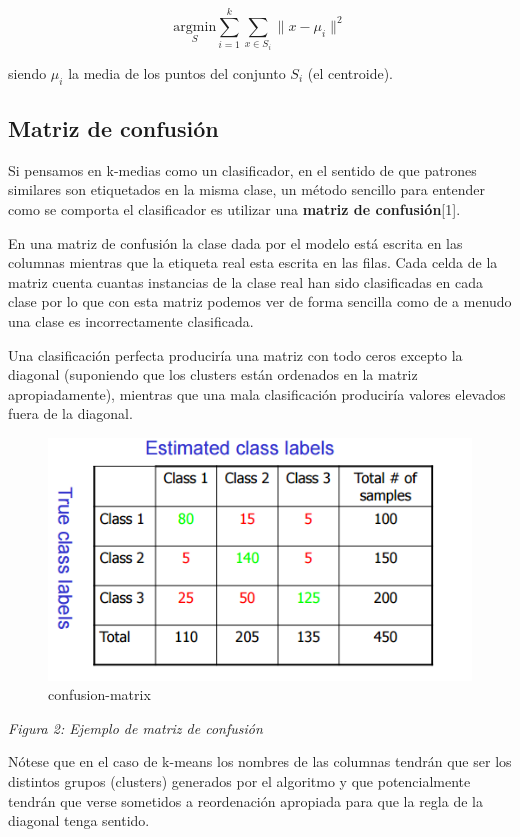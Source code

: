 \documentclass[11pt]{article}
\makeatletter
\def\maxwidth{\ifdim\Gin@nat@width>\linewidth\linewidth
    \else\Gin@nat@width\fi}
\let\Oldincludegraphics\includegraphics
\renewcommand{\includegraphics}[1]{\Oldincludegraphics[width=.8\maxwidth]{#1}}
\makeatother
\begin{document}
\[\underset{S}{\mathrm{argmin}} \sum_{i=1}^{k} \sum_{x \in S_i} \|x -\mu_i\|^2\]

siendo \(\mu_i\) la media de los puntos del conjunto \(S_i\) (el
centroide).

\subsection{Matriz de confusión}\label{matriz-de-confusiuxf3n}

Si pensamos en k-medias como un clasificador, en el sentido de que
patrones similares son etiquetados en la misma clase, un método sencillo
para entender como se comporta el clasificador es utilizar una
\textbf{matriz de confusión}{[}1{]}.

En una matriz de confusión la clase dada por el modelo está escrita en
las columnas mientras que la etiqueta real esta escrita en las filas.
Cada celda de la matriz cuenta cuantas instancias de la clase real han
sido clasificadas en cada clase por lo que con esta matriz podemos ver
de forma sencilla como de a menudo una clase es incorrectamente
clasificada.

Una clasificación perfecta produciría una matriz con todo ceros excepto
la diagonal (suponiendo que los clusters están ordenados en la matriz
apropiadamente), mientras que una mala clasificación produciría valores
elevados fuera de la diagonal.

\begin{figure}
\centering
\includegraphics{confusion_matrix.PNG}
\caption{confusion-matrix}
\end{figure}

\emph{Figura 2: Ejemplo de matriz de confusión}

Nótese que en el caso de k-means los nombres de las columnas tendrán que
ser los distintos grupos (clusters) generados por el algoritmo y que
potencialmente tendrán que verse sometidos a reordenación apropiada para
que la regla de la diagonal tenga sentido.
\end{document}
